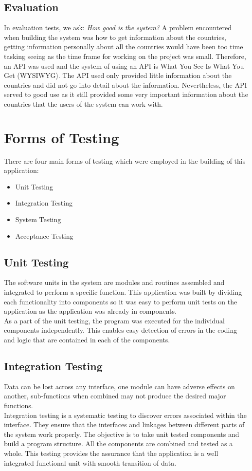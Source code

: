 \documentclass[twoside, a4paper, 12pt]{report}
\begin{document}
\subsection{Evaluation}
In evaluation tests, we ask: \emph{How good is the system?} A problem encountered when building the system was how to get information about the countries, getting information personally about all the countries would have been too time tasking seeing as the time frame for working on the project was small. Therefore, an API was used and the system of using an API is What You See Is What You Get (WYSIWYG). The API used only provided little information about the countries and did not go into detail about the information. Nevertheless, the API served to good use as it still provided some very important information about the countries that the users of the system can work with.

\section{Forms of Testing}
There are four main forms of testing which were employed in the building of this application:

\begin{itemize}
	\item Unit Testing
	\item Integration Testing
	\item System Testing
	\item Acceptance Testing
\end{itemize}

\subsection{Unit Testing}
The software units in the system are modules and routines assembled and integrated to perform a specific function. This application was built by dividing each functionality into components so it was easy to perform unit tests on the application as the application was already in components.\\
\indent
As a part of the unit testing, the program was executed for the individual components independently. This enables easy detection of errors in the coding and logic that are contained in each of the components.

\subsection{Integration Testing}
Data can be lost across any interface, one module can have adverse effects on another, sub-functions when combined may not produce the desired major functions.\\
\indent 
Integration testing is a systematic testing to discover errors associated within the interface. They ensure that the interfaces and linkages between different parts of the system work properly. The objective is to take unit tested components and build a program structure. All the components are combined and tested as a whole. This testing provides the assurance that the application is a well integrated functional unit with smooth transition of data.
\end{document}
